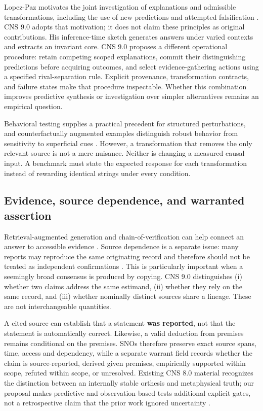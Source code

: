 \documentclass[11pt,a4paper]{article}
\begin{document}
Lopez-Paz motivates the joint investigation of explanations and
admissible transformations, including the use of new predictions and
attempted falsification \citep{R01}. CNS 9.0 adopts that motivation; it
does not claim these principles as original contributions. His
inference-time sketch generates answers under varied contexts and
extracts an invariant core. CNS 9.0 proposes a different operational
procedure: retain competing scoped explanations, commit their
distinguishing predictions before acquiring outcomes, and select
evidence-gathering actions using a specified rival-separation rule.
Explicit provenance, transformation contracts, and failure states make
that procedure inspectable. Whether this combination improves predictive
synthesis or investigation over simpler alternatives remains an
empirical question.

Behavioral testing supplies a practical precedent for structured
perturbations, and counterfactually augmented examples distinguish
robust behavior from sensitivity to superficial cues \citep{R08, R09}.
However, a transformation that removes the only relevant source is not a
mere nuisance. Neither is changing a measured causal input. A benchmark
must state the expected response for each transformation instead of
rewarding identical strings under every condition.

\subsection{Evidence, source dependence, and warranted
assertion}\label{evidence-source-dependence-and-warranted-assertion}

Retrieval-augmented generation and chain-of-verification can help
connect an answer to accessible evidence \citep{R11, R16}. Source
dependence is a separate issue: many reports may reproduce the same
originating record and therefore should not be treated as independent
confirmations \citep{R10}. This is particularly important when a
seemingly broad consensus is produced by copying. CNS 9.0 distinguishes
(i) whether two claims address the same estimand, (ii) whether they rely
on the same record, and (iii) whether nominally distinct sources share a
lineage. These are not interchangeable quantities.

A cited source can establish that a statement \textbf{was reported}, not
that the statement is automatically correct. Likewise, a valid deduction
from premises remains conditional on the premises. SNOs therefore
preserve exact source spans, time, access and dependency, while a
separate warrant field records whether the claim is source-reported,
derived given premises, empirically supported within scope, refuted
within scope, or unresolved. Existing CNS 8.0 material recognizes the
distinction between an internally stable orthesis and metaphysical
truth; our proposal makes predictive and observation-based tests
additional explicit gates, not a retrospective claim that the prior work
ignored uncertainty \citep{G02, G03, G08}.
\end{document}
